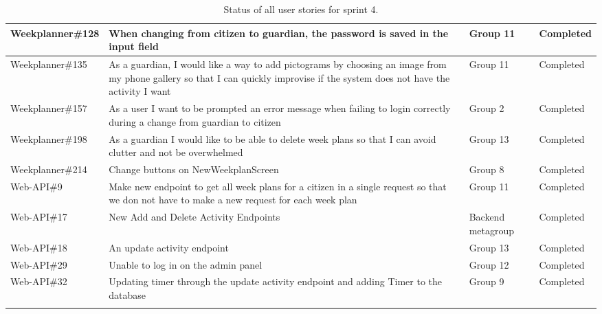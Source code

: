 \begin{longtable}{|p{2.9cm}|p{8cm}|p{2cm}|p{2cm}|}
    Weekplanner\#128 & When changing from citizen to guardian, the password is saved in the input field                                                                                                        & Group 11     & Completed    \\ \hline
    Weekplanner\#135 & As a guardian, I would like a way to add pictograms by choosing an image from my phone gallery so that I can quickly improvise if the system does not have the activity I want          & Group 11     & Completed   \\ \hline
    Weekplanner\#157 & As a user I want to be prompted an error message when failing to login correctly during a change from guardian to citizen                                                               & Group 2      & Completed    \\ \hline
    Weekplanner\#198 & As a guardian I would like to be able to delete week plans so that I can avoid clutter and not be overwhelmed                                                                           & Group 13     & Completed    \\ \hline
    Weekplanner\#214 & Change buttons on NewWeekplanScreen                                                                                                                                                     & Group 8      & Completed    \\ \hline
    Web-API\#9 & Make new endpoint to get all week plans for a citizen in a single request so that we don not have to make a new request for each week plan                                                                                                                                                      & Group 11      & Completed    \\ \hline
    Web-API\#17 & New Add and Delete Activity Endpoints                                                                                                                                                      & Backend metagroup     & Completed    \\ \hline
    Web-API\#18 & An update activity endpoint                                                                                                                                                      & Group 13     & Completed    \\ \hline
    Web-API\#29 & Unable to log in on the admin panel                                                                                                                                                       & Group 12     & Completed    \\ \hline
    Web-API\#32 & Updating timer through the update activity endpoint and adding Timer to the database                                                                                                                                                       & Group 9     & Completed    \\ \hline
    \caption{Status of all user stories for sprint 4.}\label{table:sprint-4-review}
\end{longtable}
